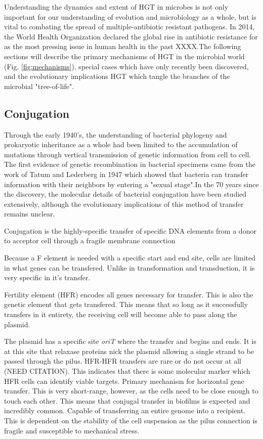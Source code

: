 Understanding the dynamics and extent of HGT in microbes is not only important
for our understanding of evolution and microbiology as a whole, but is vital to
combating the spread of multiple-antibiotic resistant pathogens. In 2014, the
World Health Organization declared the global rise in antibiotic resistance for
as the most pressing issue in human health in the past XXXX.The following
sections will describe the primary mechanisms of HGT in the microbial world
(Fig. \ref{fig:mechanisms}),
special cases which have only recently been discovered, and the evolutionary
implications HGT which tangle the branches of the microbial "tree-of-life".


\subsection*{Conjugation}

Through the early 1940's, the understanding of bacterial phylogeny and
prokaryotic inheritance as a whole had been limited to the accumulation of
mutations through vertical transmission of genetic information from cell to
cell. The first evidence of genetic recombination in bacterial specimens came
from the work of Tatum and Lederberg in 1947 which showed that bacteria can
transfer information with their neighbors by entering a "sexual
stage"\cite{Tatum:1947va}.In the 70 years since the discovery, the molecular
details of bacterial conjugation have been studied extensively, although the
evolutionary implications of this method of transfer remains unclear. 

Conjugation is the highly-specific transfer of specific DNA elements from a
donor to acceptor cell through a fragile membrane connection 


Because a F element is needed with a specific start and end site, cells are
limited in what genes can be transfered. Unlike in transformation and
transduction, it is very specific in it's transfer. 

Fertility element (HFR) encodes all genes necessary for transfer.  This is also
the genetic element that gets transfered. This means that so long as it
successfully transfers in it entirety, the receiving cell will become able to
pass along the plasmid. 

The plasmid has a specific site \textit{oriT} where the transfer and begins and
ends. It is at this site that relaxase proteins nick the plasmid allowing a
single strand to be passed through the pilus.  HFR-HFR transfers are rare or do
not occur at all (NEED CITATION).  This indicates that there is some molecular
marker which HFR cells can identify viable targets.  Primary mechanism for
horizontal gene transfer. This is very short-range, however, as the cells need
to be close enough to touch each other. This means that conjugal transfer in
biofilms is expected and incredibly common.  Capable of transferring an entire
genome into a recipient. This is dependent on the stability of the cell
suspension as the pilus connection is fragile and susceptible
to mechanical stress.

